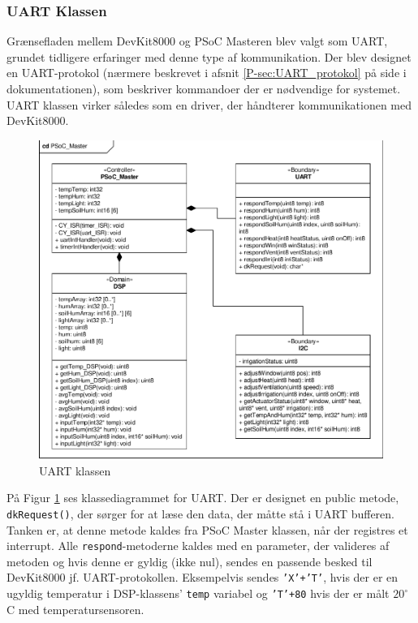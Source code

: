 \subsubsection{UART Klassen}

Grænsefladen mellem DevKit8000 og PSoC Masteren blev valgt som UART, grundet tidligere erfaringer med denne type af kommunikation. Der blev designet en UART-protokol (nærmere beskrevet i afsnit \ref{P-sec:UART_protokol}  på side \pageref{P-sec:UART_protokol} i dokumentationen), som beskriver kommandoer der er nødvendige for systemet. UART klassen virker således som en driver, der håndterer kommunikationen med DevKit8000.

\begin{figure}[h]
\centering 
\includegraphics[width=\textwidth * 2/5, trim=269 253 17 30, clip=true] {../fig/cd_PSoC_master.pdf}
\caption{UART klassen}
\label{fig:UART_klasse}
\end{figure}

På Figur \ref{fig:UART_klasse} ses klassediagrammet for UART. Der er designet en public metode, \texttt{dkRequest()}, der sørger for at læse den data, der måtte stå i UART bufferen. Tanken er, at denne metode kaldes fra PSoC Master klassen, når der registres et interrupt. Alle \texttt{respond}-metoderne kaldes med en parameter, der valideres af metoden og hvis denne er gyldig (ikke nul), sendes en passende besked til DevKit8000 jf. UART-protokollen. Eksempelvis sendes \texttt{'X'+'T'}, hvis der er en ugyldig temperatur i DSP-klassens' \texttt{temp} variabel og \texttt{'T'+80} hvis der er målt $20^{\circ}$C med temperatursensoren.